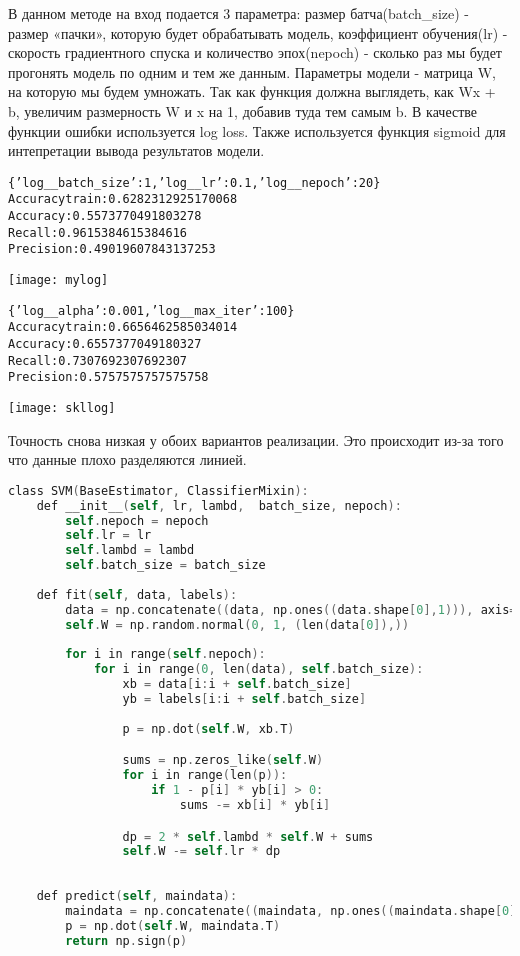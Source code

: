 В данном методе на вход подается 3 параметра: размер батча(batch_size) - размер «пачки», которую будет обрабатывать модель, коэффициент обучения(lr) - скорость градиентного
спуска и количество эпох(nepoch) - сколько раз мы будет прогонять модель по одним
и тем же данным. Параметры модели - матрица W, на которую мы будем умножать.
Так как функция должна выглядеть, как Wx + b, увеличим размерность W и x на 1,
добавив туда тем самым b. В качестве функции ошибки используется log loss. Также
используется функция sigmoid для интепретации вывода результатов модели.

\begin{alltt}
\{'log\_\_batch\_size': 1, 'log\_\_lr': 0.1, 'log\_\_nepoch': 20\}
Accuracy train: 0.6282312925170068
Accuracy: 0.5573770491803278
Recall: 0.9615384615384616
Precision: 0.49019607843137253
\end{alltt}


\texttt{[image: mylog]} 

\begin{alltt}
\{'log\_\_alpha': 0.001, 'log\_\_max_iter': 100\}
Accuracy train: 0.6656462585034014
Accuracy: 0.6557377049180327
Recall: 0.7307692307692307
Precision: 0.5757575757575758
\end{alltt}
\texttt{[image: skllog]}

Точность снова низкая у обоих вариантов реализации. Это происходит из-за того что данные плохо разделяются линией.



\begin{lstlisting}[language=C]
class SVM(BaseEstimator, ClassifierMixin):
    def __init__(self, lr, lambd,  batch_size, nepoch):
        self.nepoch = nepoch
        self.lr = lr
        self.lambd = lambd
        self.batch_size = batch_size
        
    def fit(self, data, labels):
        data = np.concatenate((data, np.ones((data.shape[0],1))), axis=1)
        self.W = np.random.normal(0, 1, (len(data[0]),))
        
        for i in range(self.nepoch):
            for i in range(0, len(data), self.batch_size):
                xb = data[i:i + self.batch_size]
                yb = labels[i:i + self.batch_size]
                
                p = np.dot(self.W, xb.T)

                sums = np.zeros_like(self.W)
                for i in range(len(p)):
                    if 1 - p[i] * yb[i] > 0:
                        sums -= xb[i] * yb[i]

                dp = 2 * self.lambd * self.W + sums
                self.W -= self.lr * dp
                
                
    def predict(self, maindata):
        maindata = np.concatenate((maindata, np.ones((maindata.shape[0],1))), axis=1)
        p = np.dot(self.W, maindata.T)
        return np.sign(p)
\end{lstlisting}



